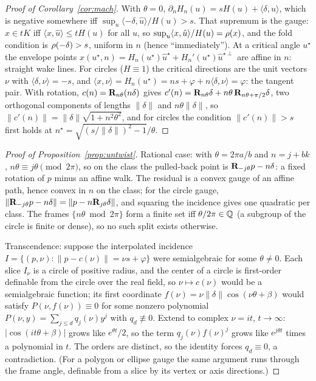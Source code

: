 \begin{proof}[Proof of Corollary~\ref{cor:mach}]
With $\theta=0$, $\partial_nH_n(u)=sH(u)+\langle\delta,\hat u\rangle$, which
is negative somewhere iff
$\sup_u\langle-\delta,\hat u\rangle/H(u)>s$. That supremum is the gauge:
$x\in tK$ iff $\langle x,\hat u\rangle\le tH(u)$ for all $u$, so
$\sup_u\langle x,\hat u\rangle/H(u)=\rho(x)$, and the fold condition is
$\rho(-\delta)>s$, uniform in $n$ (hence ``immediately''). At a critical
angle $u^\star$ the envelope points
$x(u^\star,n)=H_n(u^\star)\hat u^\star+H_n'(u^\star)\hat u^{\star\perp}$ are
affine in $n$: straight wake lines. For circles ($H\equiv1$) the critical
directions are the unit vectors $\nu$ with
$\langle\delta,\nu\rangle=-s$, and
$\langle x,\nu\rangle=H_n(u^\star)=ns+\varphi+n\langle\delta,\nu\rangle=\varphi$:
the tangent pair. With rotation, $c(n)=\mathbf{R}_{n\theta}(n\delta)$ gives
$c'(n)=\mathbf{R}_{n\theta}\delta+n\theta\,\mathbf{R}_{n\theta+\pi/2}\delta$, two orthogonal
components of lengths $\lVert\delta\rVert$ and $n\theta\lVert\delta\rVert$,
so $\lVert c'(n)\rVert=\lVert\delta\rVert\sqrt{1+n^2\theta^2}$, and for
circles the condition $\lVert c'(n)\rVert>s$ first holds at
$n^\star=\sqrt{(s/\lVert\delta\rVert)^2-1}/\theta$.
\end{proof}

\begin{proof}[Proof of Proposition~\ref{prop:untwist}]
Rational case: with $\theta=2\pi a/b$ and $n=j+bk$,
$n\theta\equiv j\theta\pmod{2\pi}$, so on the class the pulled-back point is
$\mathbf{R}_{-j\theta}p-n\delta$: a fixed rotation of $p$ minus an affine walk. The
residual is a convex gauge of an affine path, hence convex in $n$ on the
class; for the circle gauge,
$\lVert\mathbf{R}_{-j\theta}p-n\delta\rVert=\lVert p-n\mathbf{R}_{j\theta}\delta\rVert$,
and squaring the incidence gives one quadratic per class. The frames
$\{n\theta\bmod2\pi\}$ form a finite set iff $\theta/2\pi\in\mathbb{Q}$ (a subgroup
of the circle is finite or dense), so no such split exists otherwise.

Transcendence: suppose the interpolated incidence
$I=\{(p,\nu):\lVert p-c(\nu)\rVert=\nu s+\varphi\}$ were semialgebraic for
some $\theta\neq0$. Each slice $I_\nu$ is a circle of positive radius, and
the center of a circle is first-order definable from the circle over the
real field, so $\nu\mapsto c(\nu)$ would be a semialgebraic function; its
first coordinate $f(\nu)=\nu\lVert\delta\rVert\cos(\nu\theta+\beta)$ would
satisfy $P(\nu,f(\nu))\equiv0$ for some nonzero polynomial
$P(\nu,y)=\sum_{j\le d}q_j(\nu)y^j$ with $q_d\not\equiv0$. Extend to complex
$\nu=it$, $t\to\infty$: $|\cos(it\theta+\beta)|$ grows like
$e^{\theta t}/2$, so the term $q_j(\nu)f(\nu)^j$ grows like
$e^{j\theta t}$ times a polynomial in $t$. The orders are distinct, so the
identity forces $q_d\equiv0$, a contradiction. (For a polygon or ellipse
gauge the same argument runs through the frame angle, definable from a slice
by its vertex or axis directions.)
\end{proof}

